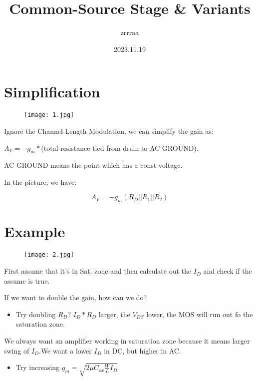 \documentclass[fontset=windows]{article}
\title{\heiti\zihao{2} Common-Source Stage \uppercase\expandafter{\romannumeral2} \& Variants}
\author{\songti zrrraa}
\date{2023.11.19}
\begin{document}
\maketitle
\thispagestyle{empty}

\section*{Simplification}

\begin{figure}[htbp]
    \centering
    \texttt{[image: 1.jpg]}
    \captionsetup{labelformat=empty}
    \caption{}
    \label{1}
\end{figure}

Ignore the Channel-Length Modulation, we can simplify the gain as:

$A_V=-g_m*$(total resistance tied from drain to AC GROUND).

AC GROUND means the point which has a const voltage.

In the picture, we have:

$$A_V=-g_m(R_D||R_1||R_2)$$

\section*{Example}

\begin{figure}[htbp]
    \centering
    \texttt{[image: 2.jpg]}
    \captionsetup{labelformat=empty}
    \caption{}
    \label{2}
\end{figure}

First assume that it's in Sat. zone and then calculate out the $I_D$ and check if the assume is true.

If we want to double the gain, how can we do?

\begin{itemize}
    \item Try doubling $R_D$? $I_D*R_D$ larger, the $V_{DS}$ lower, the MOS will run out fo the saturation zone.
\end{itemize}

We always want an amplifier working in saturation zone because it means larger swing of $I_D$.We want a lower $I_D$ in DC, but higher in AC.

\begin{itemize}
    \item Try increasing $g_m=\sqrt{2\mu C_{ox}\frac{W}{L}I_D}$
\end{itemize}
\end{document}
